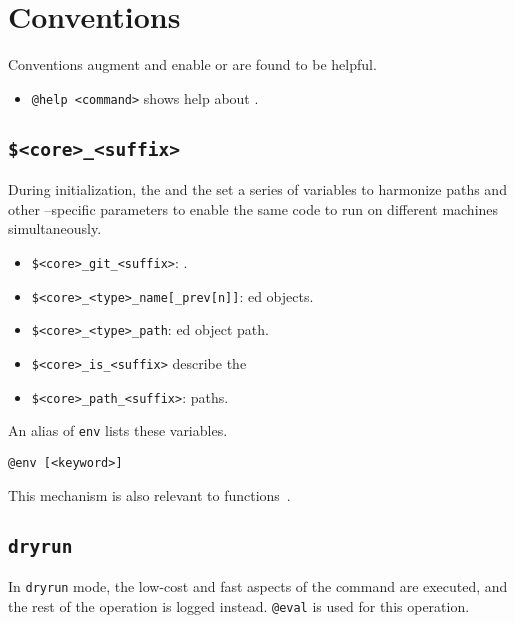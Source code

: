 \section{Conventions}\label{conventions}\label{core}\label{help}

Conventions augment and enable  or are found to be helpful.
%
\begin{itemize}
    \item \texttt{@help <command>} shows help about .
\end{itemize}  

\subsection{\texttt{\$<core>\_<suffix>}}\label{awareness}

During initialization, the  and the  set a series of variables to harmonize paths and other --specific parameters to enable the same code to run on different machines simultaneously. 
%
\begin{itemize}
    \item{\texttt{\$<core>\_git\_<suffix>}: .}
    \item{\texttt{\$<core>\_<type>\_name[\_prev[n]]}: ed objects.}
    \item{\texttt{\$<core>\_<type>\_path}: ed object path.}
    \item{\texttt{\$<core>\_is\_<suffix>} describe the }
    \item{\texttt{\$<core>\_path\_<suffix>}: paths.}
\end{itemize}
%
An alias of \texttt{env} lists these variables.
%
\begin{verbatim}
@env [<keyword>]
\end{verbatim}

This mechanism is also relevant to functions~\cite{namespaces}.

\subsection{\texttt{dryrun}}\label{dryrun}

In \texttt{dryrun} mode, the low-cost and fast aspects of the command are executed, and the rest of the operation is logged instead. \texttt{@eval} is used for this operation. 




